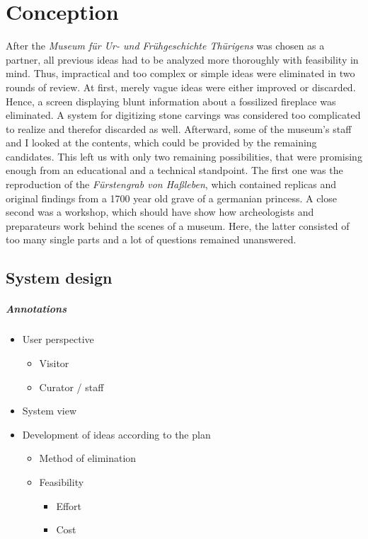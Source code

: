 \chapter{Conception}
\label{conception}

After the \textit{Museum für Ur- und Frühgeschichte Thürigens} was chosen as a partner, all previous ideas had to be analyzed more thoroughly with feasibility in mind. Thus, impractical and too complex or simple ideas were eliminated in two rounds of review. At first, merely vague ideas were either improved or discarded. Hence, a screen displaying blunt information about a fossilized fireplace was eliminated. A system for digitizing stone carvings was considered too complicated to realize and therefor discarded as well. Afterward, some of the museum's staff and I looked at the contents, which could be provided by the remaining candidates. This left us with only two remaining possibilities, that were promising enough from an educational and a technical standpoint. The first one was the reproduction of the \textit{Fürstengrab von Haßleben}, which contained replicas and original findings from a 1700 year old grave of a germanian princess. A close second was a workshop, which should have show how archeologists and preparateurs work behind the scenes of a museum. Here, the latter consisted of too many single parts and a lot of questions remained unanswered. 


\section{System design}
\label{conception_system}

\paragraph{Annotations}

\begin{itemize}
	\item User perspective
	\begin{itemize}
		\item Visitor
		\item Curator / staff
	\end{itemize}
	\item System view
	\\
	\item Development of ideas according to the plan
	\begin{itemize}
		\item Method of elimination
		\item Feasibility
		\begin{itemize}
			\item Effort
			\item Cost
		\end{itemize}
	\end{itemize}
\end{itemize}

